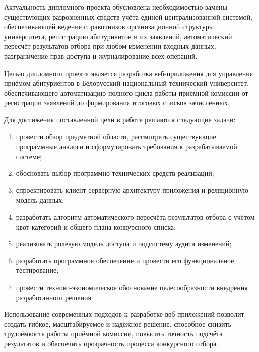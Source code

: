 Актуальность дипломного проекта обусловлена необходимостью замены существующих разрозненных средств учёта единой централизованной системой, обеспечивающей ведение справочников организационной структуры университета, регистрацию абитуриентов и их заявлений, автоматический пересчёт результатов отбора при любом изменении входных данных, разграничение прав доступа и журналирование всех операций.

Целью дипломного проекта является разработка веб-приложения для управления приёмом абитуриентов в Белорусский национальный технический университет, обеспечивающего автоматизацию полного цикла работы приёмной комиссии от регистрации заявлений до формирования итоговых списков зачисленных.

Для достижения поставленной цели в работе решаются следующие задачи:
\begin{enumerate}
\item провести обзор предметной области, рассмотреть существующие программные аналоги и сформулировать требования к разрабатываемой системе;
\item обосновать выбор программно-технических средств реализации;
\item спроектировать клиент-серверную архитектуру приложения и реляционную модель данных;
\item разработать алгоритм автоматического пересчёта результатов отбора с учётом квот категорий и общего плана конкурсного списка;
\item реализовать ролевую модель доступа и подсистему аудита изменений;
\item разработать программное обеспечение и провести его функциональное тестирование;
\item провести технико-экономическое обоснование целесообразности внедрения разработанного решения.
\end{enumerate}

Использование современных подходов к разработке веб-приложений позволит создать гибкое, масштабируемое и надёжное решение, способное снизить трудоёмкость работы приёмной комиссии, повысить точность подсчёта результатов и обеспечить прозрачность процесса конкурсного отбора.

